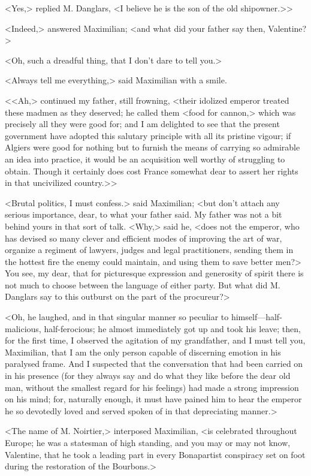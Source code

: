<Yes,> replied M. Danglars, <I believe he is the son of the old shipowner.>>

 <Indeed,> answered Maximilian; <and what did your father say then, Valentine?> 

 <Oh, such a dreadful thing, that I don't dare to tell you.> 

 <Always tell me everything,> said Maximilian with a smile. 

<<Ah,> continued my father, still frowning, <their idolized emperor treated these madmen as they deserved; he called them <food for cannon,> which was precisely all they were good for; and I am delighted to see that the present government have adopted this salutary principle with all its pristine vigour; if Algiers were good for nothing but to furnish the means of carrying so admirable an idea into practice, it would be an acquisition well worthy of struggling to obtain. Though it certainly does cost France somewhat dear to assert her rights in that uncivilized country.>>

 <Brutal politics, I must confess.> said Maximilian; <but don't attach any serious importance, dear, to what your father said. My father was not a bit behind yours in that sort of talk. <Why,> said he, <does not the emperor, who has devised so many clever and efficient modes of improving the art of war, organize a regiment of lawyers, judges and legal practitioners, sending them in the hottest fire the enemy could maintain, and using them to save better men?> You see, my dear, that for picturesque expression and generosity of spirit there is not much to choose between the language of either party. But what did M. Danglars say to this outburst on the part of the procureur?> 

 <Oh, he laughed, and in that singular manner so peculiar to himself—half-malicious, half-ferocious; he almost immediately got up and took his leave; then, for the first time, I observed the agitation of my grandfather, and I must tell you, Maximilian, that I am the only person capable of discerning emotion in his paralysed frame. And I suspected that the conversation that had been carried on in his presence (for they always say and do what they like before the dear old man, without the smallest regard for his feelings) had made a strong impression on his mind; for, naturally enough, it must have pained him to hear the emperor he so devotedly loved and served spoken of in that depreciating manner.> 

 <The name of M. Noirtier,> interposed Maximilian, <is celebrated throughout Europe; he was a statesman of high standing, and you may or may not know, Valentine, that he took a leading part in every Bonapartist conspiracy set on foot during the restoration of the Bourbons.> 

